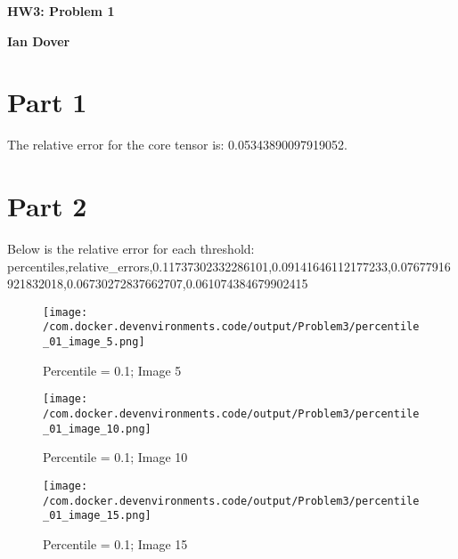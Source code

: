 \documentclass{article}%
\begin{document}
%
\normalsize%
\pagestyle{header}%
\begin{minipage}{\textwidth}%
\centering%
\begin{Large}%
\textbf{HW3: Problem 1}%
\end{Large}%
\linebreak%
\begin{large}%
\textbf{Ian Dover}%
\end{large}%
\end{minipage}%
\section{Part 1}%
\label{sec:Part1}%
The relative error for the core tensor is: 0.05343890097919052.\newline%
\newline%
\newline%

%
\section{Part 2}%
\label{sec:Part2}%
Below is the relative error for each threshold:\newline%
%
percentiles,relative\_errors,0.11737302332286101,0.09141646112177233,0.07677916921832018,0.06730272837662707,0.061074384679902415\newline%
\newline%
\newline%
%


\begin{figure}[h!]%
\centering%
\texttt{[image: /com.docker.devenvironments.code/output/Problem3/percentile\_01\_image\_5.png]}%
\caption{Percentile = 0.1; Image 5}%
\end{figure}

%


\begin{figure}[h!]%
\centering%
\texttt{[image: /com.docker.devenvironments.code/output/Problem3/percentile\_01\_image\_10.png]}%
\caption{Percentile = 0.1; Image 10}%
\end{figure}

%


\begin{figure}[h!]%
\centering%
\texttt{[image: /com.docker.devenvironments.code/output/Problem3/percentile\_01\_image\_15.png]}%
\caption{Percentile = 0.1; Image 15}%
\end{figure}
\end{document}
